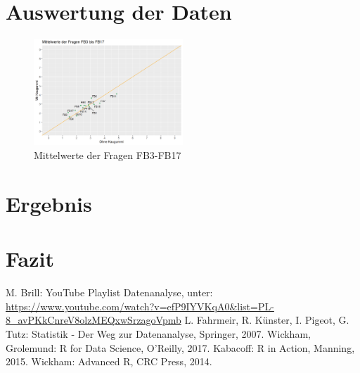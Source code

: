 \documentclass[conference]{IEEEtran}
\begin{document}
\section{Auswertung der Daten}




\begin{figure}
	\centering
	\includegraphics[width=0.5\textwidth]{Mittelwert3-17.png}
	\caption{Mittelwerte der Fragen FB3-FB17}
	\label{img:mittelwerte}
\end{figure}



\section{Ergebnis}



\section{Fazit}



\begin{thebibliography}{00}
 M. Brill: YouTube Playlist Datenanalyse, unter: {\url{https://www.youtube.com/watch?v=efP9IYVKqA0&list=PL-8_avPKkCnreV8olzMEQxwSrzagoVpmb}}
 L. Fahrmeir, R. Künster, I. Pigeot, G. Tutz: Statistik - Der Weg zur Datenanalyse, Springer, 2007.
 Wickham, Grolemund: R for Data Science, O'Reilly, 2017.
 Kabacoff: R in Action, Manning, 2015.
 Wickham: Advanced R, CRC Press, 2014.
\end{thebibliography}
\end{document}
